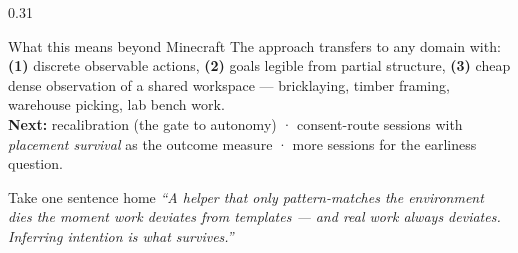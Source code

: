 \documentclass[final]{beamer}
\begin{document}
\begin{frame}[t]
\begin{columns}[t]
\begin{column}{0.31\textwidth}
\begin{block}{What this means beyond Minecraft}
The approach transfers to any domain with: \textbf{(1)} discrete observable
actions, \textbf{(2)} goals legible from partial structure, \textbf{(3)}
cheap dense observation of a shared workspace --- bricklaying, timber
framing, warehouse picking, lab bench work.\\[0.5em]
\textbf{Next:} recalibration (the gate to autonomy) · consent-route sessions
with \emph{placement survival} as the outcome measure · more sessions for
the earliness question.
\end{block}

\begin{block}{Take one sentence home}
\centering\large\itshape
``A helper that only pattern-matches the environment dies the moment work
deviates from templates --- and real work always deviates.\\
Inferring intention is what survives.''
\end{block}

\end{column}
\end{columns}


\end{frame}
\end{document}
